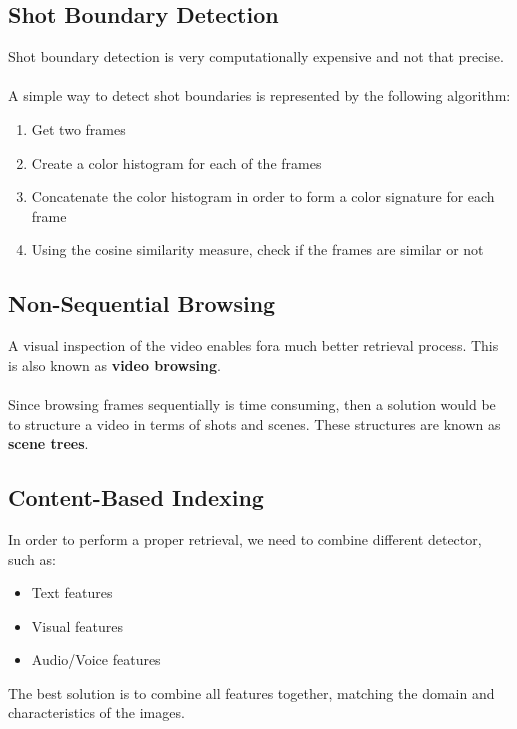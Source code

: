 \documentclass{article}
\begin{document}
\subsection{Shot Boundary Detection}
Shot boundary detection is very computationally expensive and not that precise. \\ \\
A simple way to detect shot boundaries is represented by the following algorithm:

\begin{enumerate}
	\item Get two frames
	\item Create a color histogram for each of the frames
	\item Concatenate the color histogram in order to form a color signature for each frame
	\item Using the cosine similarity measure, check if the frames are similar or not
\end{enumerate}

\subsection{Non-Sequential Browsing}
A visual inspection of the video enables fora much better retrieval process. This is also known as \textbf{video browsing}. \\ \\
Since browsing frames sequentially is time consuming, then a solution would be to structure a video in terms of shots and scenes. These structures are known as \textbf{scene trees}.

\subsection{Content-Based Indexing}
In order to perform a proper retrieval, we need to combine different detector, such as:

\begin{itemize}
	\item Text features
	\item Visual features
	\item Audio/Voice features
\end{itemize}
The best solution is to combine all features together, matching the domain and characteristics of the images.
\end{document}
